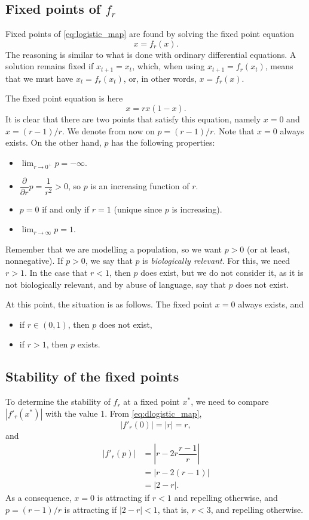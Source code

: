 \subsection{Fixed points of $f_r$}
Fixed points of \eqref{eq:logistic_map} are found by solving the fixed point equation
\[
x=f_r(x).
\]
The reasoning is similar to what is done with ordinary differential equations. A solution remains fixed if $x_{t+1}=x_t$, which, when using $x_{t+1}=f_r(x_t)$, means that we must have $x_t=f_r(x_t)$, or, in other words, $x=f_r(x)$.

The fixed point equation is here
\[
x=r x(1-x).
\]
It is clear that there are two points that satisfy this equation, namely $x=0$ and $x=(r-1)/r$. We denote from now on $p=(r-1)/r$.
Note that $x=0$ always exists. On the other hand, $p$ has the following properties:
\begin{itemize}
\item $\lim_{r\to 0^+}p=-\infty$.
\item $\dfrac{\partial}{\partial r}p=\dfrac{1}{r^2}>0$, so $p$ is an increasing function of $r$.
\item $p=0$ if and only if $r=1$ (unique since $p$ is increasing).
\item $\lim_{r\to\infty}p=1$.
\end{itemize}
Remember that we are modelling a population, so we want $p>0$ (or at least, nonnegative). If $p>0$, we say that $p$ is \emph{biologically relevant}. For this, we need $r>1$. In the case that $r<1$, then $p$ does exist, but we do not consider it, as it is not biologically relevant, and by abuse of language, say that $p$ does not exist.

\vskip0.5cm
 At this point, the situation is as follows. The fixed point $x=0$ always exists, and
\begin{itemize}
\item if $r\in(0,1)$, then $p$ does not exist,
\item if $r>1$, then $p$ exists.
\end{itemize}


\subsection{Stability of the fixed points}
To determine the stability of $f_r$ at a fixed point $x^*$, we need to compare $|f'_r(x^*)|$ with the value 1. From \eqref{eq:dlogistic_map},
\[
|f'_r(0)|=|r|=r,
\]
and
\begin{align*}
|f'_r(p)| &= \left|r-2r\dfrac{r-1}{r}\right|\\
&= |r-2(r-1)| \\
&= |2-r|.
\end{align*}
As a consequence, $x=0$ is attracting if $r<1$ and repelling otherwise, and $p=(r-1)/r$ is attracting if $|2-r|<1$, that is, $r<3$, and repelling otherwise.

